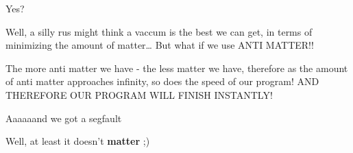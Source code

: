 \documentclass{article}
\begin{document}
\begin{sketch}
Yes?

Well, a silly rus might think a vaccum is the best we can get, in terms of minimizing the amount of matter… But what if we use ANTI MATTER!!

The more anti matter we have - the less matter we have, therefore as the amount of anti matter approaches infinity, so does the speed of our program! AND THEREFORE OUR PROGRAM WILL FINISH INSTANTLY!

Aaaaaand we got a segfault

Well, at least it doesn’t \textbf{matter} ;)


\end{sketch}
\end{document}
